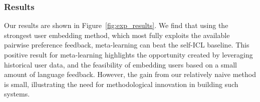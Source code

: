 \subsubsection{Results}

Our results are shown in Figure~\ref{fig:exp_results}.  
We find that using the strongest user embedding method, which most fully exploits the available pairwise preference feedback, meta-learning can beat the self-ICL baseline.
This positive result for meta-learning highlights the opportunity created by leveraging historical user data, and the feasibility of embedding users based on a small amount of language feedback.
However, the gain from our relatively naive method is small, illustrating the need for methodological innovation in building such systems.
